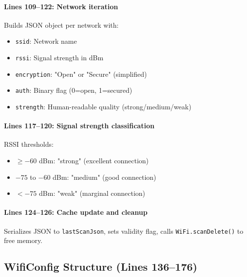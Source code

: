 \documentclass[11pt,a4paper]{article}
\begin{document}
\paragraph{Lines 109--122: Network iteration}
Builds JSON object per network with:
\begin{itemize}[leftmargin=*]
  \item \texttt{ssid}: Network name
  \item \texttt{rssi}: Signal strength in dBm
  \item \texttt{encryption}: "Open" or "Secure" (simplified)
  \item \texttt{auth}: Binary flag (0=open, 1=secured)
  \item \texttt{strength}: Human-readable quality (strong/medium/weak)
\end{itemize}

\paragraph{Lines 117--120: Signal strength classification}
RSSI thresholds:
\begin{itemize}[leftmargin=*]
  \item $\geq -60$ dBm: "strong" (excellent connection)
  \item $-75$ to $-60$ dBm: "medium" (good connection)
  \item $< -75$ dBm: "weak" (marginal connection)
\end{itemize}

\paragraph{Lines 124--126: Cache update and cleanup}
Serializes JSON to \texttt{lastScanJson}, sets validity flag, calls \texttt{WiFi.scanDelete()} to free memory.

\subsection{WifiConfig Structure (Lines 136--176)}
\end{document}
